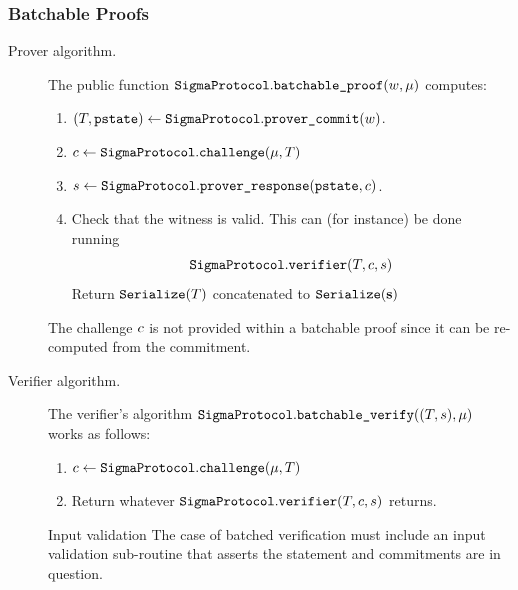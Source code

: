 \documentclass[11pt]{article}
\begin{document}
\subsubsection{Batchable Proofs}

\begin{description}
\item[Prover algorithm.]
The public function $\texttt{SigmaProtocol}.\texttt{batchable\_proof}( w, \mu)$ computes:
\begin{enumerate}
\item
   $(T,\texttt{pstate})\gets\texttt{SigmaProtocol}.\texttt{prover\_commit}( w)$.
\item
$c \gets \texttt{SigmaProtocol}.\texttt{challenge}(\mu,T)$
\item
   $s\gets\texttt{SigmaProtocol}.\texttt{prover\_response}(\texttt{pstate},  c)$.
   \item Check that the witness is valid. This can (for instance) be done running \[\texttt{SigmaProtocol}.\texttt{verifier}(T, c, s)\]
  Return $\texttt{Serialize}(T)$ concatenated to $\texttt{Serialize}(\mathbf {s})$
\end{enumerate}
The challenge $c$ is not provided within a batchable proof since it can be re-computed from the commitment.
\item[Verifier algorithm.] The verifier's algorithm $\texttt{SigmaProtocol}.\texttt{batchable\_verify}((T,s), \mu)$ works as follows:
\begin{enumerate}
  \item
    $c \gets \texttt{SigmaProtocol}.\texttt{challenge}(\mu, T)$
  \item
    Return whatever $\texttt{SigmaProtocol}.\texttt{verifier}(T,c, s)$ returns.
\end{enumerate}
\begin{remark}{Input validation}{}
The case of batched verification must include an input validation sub-routine that asserts the statement and commitments are in question.

\end{remark}
\end{description}
\end{document}
